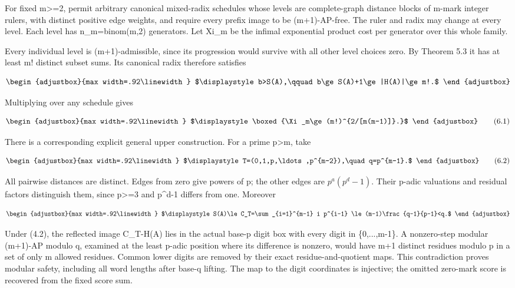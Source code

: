 For fixed m\textgreater=2, permit arbitrary canonical mixed-radix schedules whose levels are complete-graph distance blocks of m-mark integer rulers, with distinct positive edge weights, and require every prefix image to be (m+1)-AP-free. The ruler and radix may change at every level. Each level has n\_m=binom(m,2) generators. Let Xi\_m be the infimal exponential product cost per generator over this whole family.

Every individual level is (m+1)-admissible, since its progression would survive with all other level choices zero. By Theorem 5.3 it has at least m! distinct subset sums. Its canonical radix therefore satisfies

\[
\begin{adjustbox}{max width=.92\linewidth}
$\displaystyle b>S(A),\qquad b\ge S(A)+1\ge|H(A)|\ge m!.$
\end{adjustbox}
\]

Multiplying over any schedule gives

\[
\begin{adjustbox}{max width=.92\linewidth}
$\displaystyle \boxed{\Xi_m\ge(m!)^{2/[m(m-1)]}.}$
\end{adjustbox}
\tag{6.1}
\]

There is a corresponding explicit general upper construction. For a prime p\textgreater m, take

\[
\begin{adjustbox}{max width=.92\linewidth}
$\displaystyle T=(0,1,p,\ldots,p^{m-2}),\quad q=p^{m-1}.$
\end{adjustbox}
\tag{6.2}
\]

All pairwise distances are distinct. Edges from zero give powers of p; the other edges are \(p^a(p^d-1)\). Their p-adic valuations and residual factors distinguish them, since p\textgreater=3 and p\^{}d-1 differs from one. Moreover

\[
\begin{adjustbox}{max width=.92\linewidth}
$\displaystyle S(A)\le C_T=\sum_{i=1}^{m-1} i p^{i-1}
\le(m-1)\frac{q-1}{p-1}<q.$
\end{adjustbox}
\]

Under (4.2), the reflected image C\_T-H(A) lies in the actual base-p digit box with every digit in \{0,...,m-1\}. A nonzero-step modular (m+1)-AP modulo q, examined at the least p-adic position where its difference is nonzero, would have m+1 distinct residues modulo p in a set of only m allowed residues. Common lower digits are removed by their exact residue-and-quotient maps. This contradiction proves modular safety, including all word lengths after base-q lifting. The map to the digit coordinates is injective; the omitted zero-mark score is recovered from the fixed score sum.

